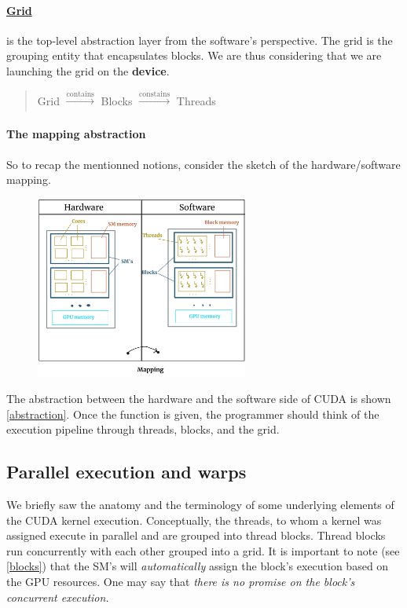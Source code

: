 \documentclass[12pt]{article}
\begin{document}
\vspace{-15pt}
\paragraph{\underline{Grid}} is the top-level abstraction layer from the software's perspective. The grid
is the grouping entity that encapsulates blocks. We are thus considering that we are launching 
the grid on the \textbf{device}.
\begin{quote}
   \centering
   Grid $\xrightarrow[]{\text{contains}}$ Blocks $\xrightarrow[]{\text{constains}}$ Threads
\end{quote}

\vspace{-18pt}
\paragraph{The mapping abstraction} So to recap the mentionned notions, consider the 
sketch of the hardware/software mapping.

\begin{figure}
      \vspace{-10pt}
      \centering
      \includegraphics[height=6cm]{hard_soft.png}
   \caption{}
   \label{abstraction}
\end{figure}
The abstraction between the hardware and the software side of CUDA is shown \autoref{abstraction}. Once the function 
is given, the programmer should think of the execution pipeline through threads, blocks, and the grid.

\clearpage
\newpage
\subsection{Parallel execution and warps}
\label{warps}
We briefly saw the anatomy and the terminology of some underlying elements of the CUDA kernel execution.
Conceptually, the threads, to whom a kernel was assigned execute in parallel and are grouped into thread blocks.
Thread blocks run concurrently with each other grouped into a grid. It is important to note (see \autoref{blocks}) that 
the SM's will \textit{automatically} assign the block's execution based on the GPU resources. One may say that 
\textsl{
there is no promise on the block's concurrent execution.
}
\end{document}
